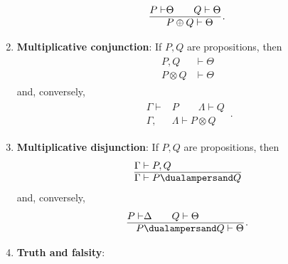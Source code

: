 \begin{enumerate}
            \begin{gather}
                \begin{aligned}
                    P\vdash&\Theta\qquad Q\vdash\Theta\\
                    \hline
                    &P\oplus Q\vdash\Theta
                \end{aligned}\,.
            \end{gather}
        \item\textbf{Multiplicative conjunction}: If $P,Q$ are propositions, then
            \begin{gather}
                \begin{aligned}
                    P,Q&\vdash\Theta\\
                    \hline
                    P\otimes Q&\vdash\Theta
                \end{aligned}
            \end{gather}
            and, conversely,
            \begin{gather}
                \begin{aligned}
                    \Gamma\vdash&P\qquad\Lambda\vdash Q\\
                    \hline
                    \Gamma,&\Lambda\vdash P\otimes Q
                \end{aligned}\,.
            \end{gather}
        \item\textbf{Multiplicative disjunction}: If $P,Q$ are propositions, then
            \begin{gather}
                \begin{aligned}
                    \Gamma&\vdash P,Q\\
                    \hline
                    \Gamma&\vdash P\dualampersand Q
                \end{aligned}
            \end{gather}
            and, conversely,
            \begin{gather}
                \begin{aligned}
                    P\vdash&\Delta\qquad Q\vdash\Theta\\
                    \hline
                    P&\dualampersand Q\vdash\Theta
                \end{aligned}\,.
            \end{gather}
        \item\textbf{Truth and falsity}:
            \begin{gather}

\end{gather}
\end{enumerate}
